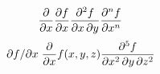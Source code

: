 \documentclass{jlreq}
\begin{document}
\[
    \pdv{}{x}
    \pdv{f}{x}
    \pdv{f}{x, y}
    \pdv[order=n]{f}{x}
\]
\[
    \pdv{f}/{x}
    \pdv*{f(x,y,z)}{x}
    \pdv[order={2, 1, 2}]{f}{x, y, z}
\]
\end{document}
